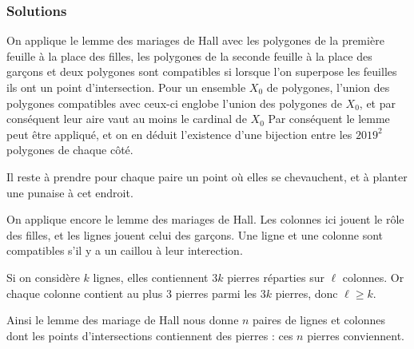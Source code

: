 \subsubsection{Solutions}


\begin{sol}
On applique le lemme des mariages de Hall avec les polygones de la première feuille à la place des filles, les polygones de la seconde feuille à la place des garçons et deux polygones sont compatibles si lorsque l'on superpose les feuilles ils ont un point d'intersection. Pour un ensemble $X_0$ de polygones, l'union des polygones compatibles avec ceux-ci englobe l'union des polygones de $X_0$, et par conséquent leur aire vaut au moins le cardinal de $X_0$ Par conséquent le lemme peut être appliqué, et on en déduit l'existence d'une bijection entre les $2019^2$ polygones de chaque côté.

\smallskip
 Il reste à prendre pour chaque paire un point où elles se chevauchent, et à planter une punaise à cet endroit.
\end{sol}


\begin{sol}
On applique encore le lemme des mariages de Hall. Les colonnes ici jouent le rôle des filles, et les lignes jouent celui des garçons. Une ligne et une colonne sont compatibles s'il y a un caillou à leur interection.

Si on considère $k$ lignes, elles contiennent $3k$ pierres réparties sur $\ell$ colonnes. Or chaque colonne contient au plus $3$ pierres parmi les $3k$ pierres, donc $\ell \ge k$.

\smallskip

Ainsi le lemme des mariage de Hall nous donne $n$ paires de lignes et colonnes dont les points d'intersections contiennent des pierres : ces $n$ pierres conviennent.
\end{sol}


